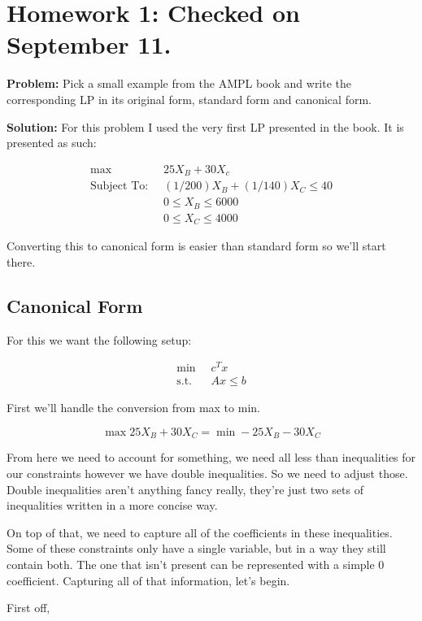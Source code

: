 \section*{Homework 1: \checkmark Checked on September 11.}


\noindent\textbf{Problem:} Pick a small example from the AMPL book and write the corresponding LP in its original form, standard form and canonical form.

\noindent\textbf{Solution:} For this problem I used the very first LP presented in the book. It is presented as such:

\begin{align*}
	\max \;\; & 25 X_B + 30X_c \\
	\text{Subject To:}\;\;  & (1/200) X_B + (1/140) X_C \leq 40 \\
	& 0 \leq X_B \leq 6000 \\
	& 0 \leq X_C \leq 4000
\end{align*}

Converting this to canonical form is easier than standard form so we'll start there.

\subsection*{Canonical Form}

For this we want the following setup:

\begin{align*}
	\min \;\; & c^T x \\
	\text{s.t.} \;\; & Ax \leq b
\end{align*}

First we'll handle the conversion from max to min.

\[\max 25 X_B + 30 X_C = \min -25 X_B - 30X_C\]

From here we need to account for something, we need all less than inequalities for our constraints however we have double inequalities. So we need to adjust those. Double inequalities aren't anything fancy really, they're just two sets of inequalities written in a more concise way.

On top of that, we need to capture all of the coefficients in these inequalities. Some of these constraints only have a single variable, but in a way they still contain both. The one that isn't present can be represented with a simple 0 coefficient. Capturing all of that information, let's begin.

First off,

